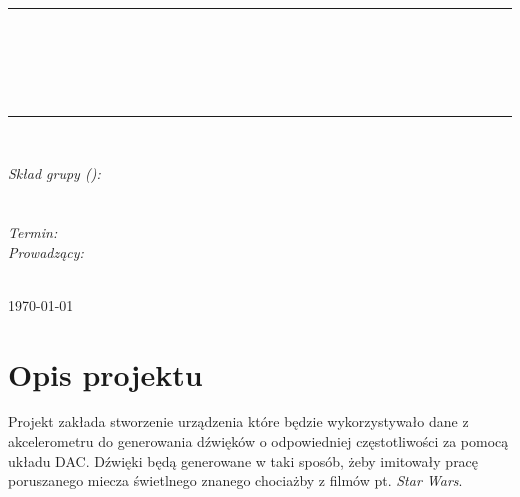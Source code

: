 \documentclass[10pt, a4paper]{article}
\begin{document}
\def\tablename{Tabela}	%

\begin{titlepage}
	\begin{center}
		\textsc{\LARGE \formakursu}\\[1cm]		
		\textsc{\Large \kurs}\\[0.5cm]		
		\rule{\textwidth}{0.08cm}\\[0.4cm]
		{\huge \bfseries \doctype}\\[1cm]
		{\huge \bfseries \projectname}\\[0.5cm]
		{\huge \bfseries \acronim}\\[0.4cm]
		\rule{\textwidth}{0.08cm}\\[1cm]
		
		\begin{flushright} \large
		\emph{Skład grupy (\nrgrupy):}\\
		\osobaA\\
		\osobaB\\[0.4cm]
		
		\emph{Termin: }\termin\\[0.4cm]

		\emph{Prowadzący:} \\
		\prowadzacy \\
		
		\end{flushright}
		
		\vfill
		
		{\large \today}
	\end{center}	
\end{titlepage}

\newpage
\tableofcontents
\newpage

\section{Opis projektu}
\label{sec:OpisProjektu}
Projekt zakłada stworzenie urządzenia które będzie wykorzystywało dane z akcelerometru do generowania dźwięków o odpowiedniej częstotliwości za pomocą układu DAC. Dźwięki będą generowane w taki sposób, żeby imitowały pracę poruszanego miecza świetlnego znanego chociażby z filmów pt. \textit{Star Wars}. 
\end{document}
